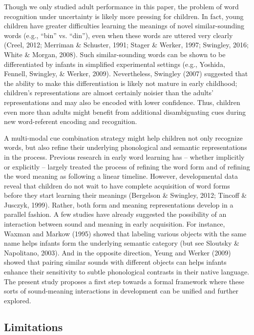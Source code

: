 \documentclass[english,,man,floatsintext]{apa6}
\theoremstyle{definition}
\theoremstyle{definition}
\theoremstyle{definition}
\theoremstyle{remark}
\begin{document}
Though we only studied adult performance in this paper, the problem of
word recognition under uncertainty is likely more pressing for children.
In fact, young children have greater difficulties learning the meanings
of novel similar-sounding words (e.g., \enquote{bin} vs. \enquote{din}),
even when these words are uttered very clearly (Creel, 2012; Merriman \&
Schuster, 1991; Stager \& Werker, 1997; Swingley, 2016; White \& Morgan,
2008). Such similar-sounding words can be shown to be differentiated by
infants in simplified experimental settings (e.g., Yoshida, Fennell,
Swingley, \& Werker, 2009). Nevertheless, Swingley (2007) suggested that
the ability to make this differentiation is likely not mature in early
childhood; children's representations are almost certainly noisier than
the adults' representations and may also be encoded with lower
confidence. Thus, children even more than adults might benefit from
additional disambiguating cues during new word-referent encoding and
recognition.

A multi-modal cue combination strategy might help children not only
recognize words, but also refine their underlying phonological and
semantic representations in the process. Previous research in early word
learning has -- whether implicitly or explicitly -- largely treated the
process of refining the word form and of refining the word meaning as
following a linear timeline. However, developmental data reveal that
children do not wait to have complete acquisition of word forms before
they start learning their meanings (Bergelson \& Swingley, 2012; Tincoff
\& Jusczyk, 1999). Rather, both form and meaning representations develop
in a parallel fashion. A few studies have already suggested the
possibility of an interaction between sound and meaning in early
acquisition. For instance, Waxman and Markow (1995) showed that labeling
various objects with the same name helps infants form the underlying
semantic category (but see Sloutsky \& Napolitano, 2003). And in the
opposite direction, Yeung and Werker (2009) showed that pairing similar
sounds with different objects can helps infants enhance their
sensitivity to subtle phonological contrasts in their native language.
The present study proposes a first step towards a formal framework where
these sorts of sound-meaning interactions in development can be unified
and further explored.

\subsection{Limitations}\label{limitations}
\end{document}
